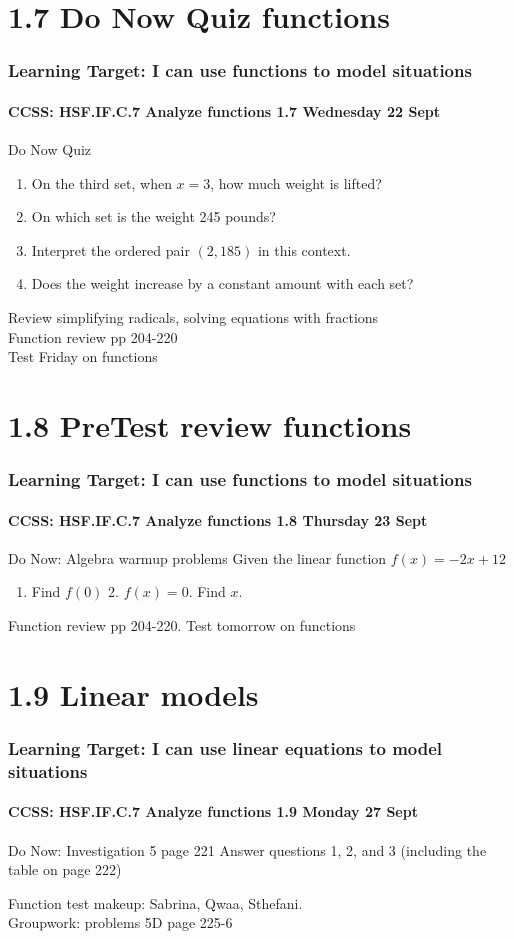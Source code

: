 \documentclass{beamer}
\begin{document}
  \section{1.7 Do Now Quiz functions}
  \frame
  {
    \frametitle{Learning Target: I can use functions to model situations}
    \framesubtitle{CCSS: HSF.IF.C.7 Analyze functions \hfill \alert{1.7 Wednesday 22 Sept}}

    \begin{block}{Do Now Quiz}

    \end{block}
    \begin{enumerate}
      \item On the third set, when $x=3$, how much weight is lifted?
      \item On which set is the weight 245 pounds?
      \item Interpret the ordered pair $(2,185)$ in this context.
      \item Does the weight increase by a constant amount with each set?
    \end{enumerate}
    Review simplifying radicals, solving equations with fractions\\
    Function review pp 204-220 \\
    \alert{Test Friday on functions}
  }

  \section{1.8 PreTest review functions}
  \frame
  {
    \frametitle{Learning Target: I can use functions to model situations}
    \framesubtitle{CCSS: HSF.IF.C.7 Analyze functions \hfill \alert{1.8 Thursday 23 Sept}}

    \begin{block}{Do Now: Algebra warmup problems}
      Given the linear function $f(x)=-2x+12$
      \begin{enumerate}
        \item Find $f(0)$ \hspace{3cm}
        2. $f(x)=0$. Find $x$.
    \end{enumerate}
    \end{block}\vspace{3cm}
    Function review pp 204-220.
    \alert{Test tomorrow on functions}
  }

  \section{1.9 Linear models}
  \frame
  {
    \frametitle{Learning Target: I can use linear equations to model situations}
    \framesubtitle{CCSS: HSF.IF.C.7 Analyze functions \hfill \alert{1.9 Monday 27 Sept}}

    \begin{block}{Do Now: Investigation 5 page 221}
        Answer questions 1, 2, and 3 (including the table on page 222)
    \end{block}\vspace{3cm}
    Function test makeup: Sabrina, Qwaa, Sthefani.\\[0.5cm]
    Groupwork: problems 5D page 225-6
  }
\end{document}
